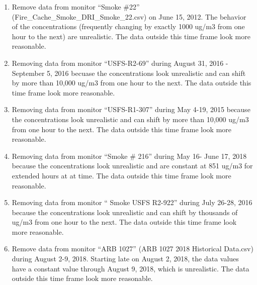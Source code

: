 \begin{enumerate}[nolistsep]
\begin{enumerate}[nolistsep]
	\item Remove data from monitor ``Smoke \#22'' (Fire\_Cache\_Smoke\_DRI\_Smoke\_22.csv) on June 15, 2012. The behavior of the concentrations (frequently changing by exactly 1000 ug/m3 from one hour to the next) are unrealistic. The data outside this time frame look more reasonable.
	\item Removing data from monitor ``USFS-R2-69'' during August 31, 2016 - September 5, 2016 becuase the concentrations look unrealistic and can shift by more than 10,000 ug/m3 from one hour to the next. The data outside this time frame look more reasonable.
	\item Removing data from monitor ``USFS-R1-307'' during May 4-19, 2015 because the concentrations look unrealistic and can shift by more than 10,000 ug/m3 from one hour to the next. The data outside this time frame look more reasonable.
	\item Removing data from monitor ``Smoke \# 216'' during May 16- June 17, 2018 because the concentrations look unrealistic and are constant at 851 ug/m3 for extended hours at at time. The data outside this time frame look more reasonable.
	\item Removing data from monitor `` Smoke USFS R2-922'' during July 26-28, 2016 because the concentrations look unrealistic and can shift by thousands of ug/m3 from one hour to the next. The data outside this time frame look more reasonable.

\item Remove data from monitor ``ARB 1027'' (ARB 1027 2018 Historical Data.csv) during August 2-9, 2018. Starting late on August 2, 2018, the data values have a constant value through August 9, 2018, which is unrealistic. The data outside this time frame look more reasonable.


\end{enumerate}
\end{enumerate}
